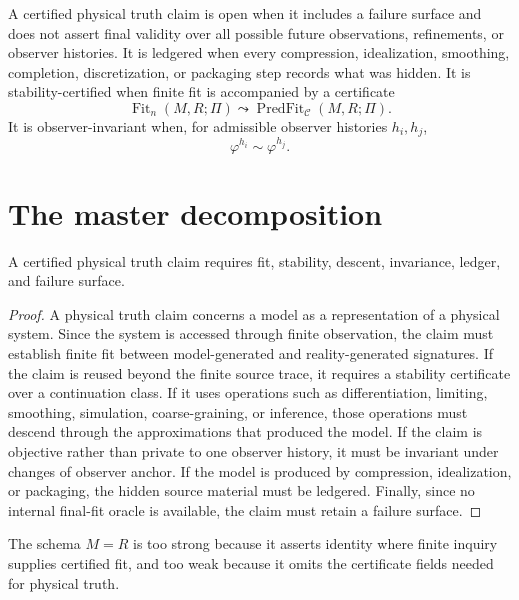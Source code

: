 \begin{definition}
\label{def:open-ledgered-stability-observer-truth}
A certified physical truth claim is open when it includes a failure surface and does not assert final validity over all possible future observations, refinements, or observer histories. It is ledgered when every compression, idealization, smoothing, completion, discretization, or packaging step records what was hidden. It is stability-certified when finite fit is accompanied by a certificate
$$
\operatorname{Fit}_n(M,R;\Pi)
\leadsto
\operatorname{PredFit}_{\mathcal C}(M,R;\Pi).
$$
It is observer-invariant when, for admissible observer histories $h_i,h_j$,
$$
\varphi^{h_i}
\sim
\varphi^{h_j}.
$$
\end{definition}

\section{The master decomposition}
\label{sec:master-decomposition}

\begin{theorem}
\label{thm:physical-truth-decomposes}
A certified physical truth claim requires fit, stability, descent, invariance, ledger, and failure surface.
\end{theorem}

\begin{proof}
A physical truth claim concerns a model as a representation of a physical system. Since the system is accessed through finite observation, the claim must establish finite fit between model-generated and reality-generated signatures. If the claim is reused beyond the finite source trace, it requires a stability certificate over a continuation class. If it uses operations such as differentiation, limiting, smoothing, simulation, coarse-graining, or inference, those operations must descend through the approximations that produced the model. If the claim is objective rather than private to one observer history, it must be invariant under changes of observer anchor. If the model is produced by compression, idealization, or packaging, the hidden source material must be ledgered. Finally, since no internal final-fit oracle is available, the claim must retain a failure surface.
\end{proof}

\begin{corollary}
\label{cor:identity-wrong-truth-schema}
The schema $M=R$ is too strong because it asserts identity where finite inquiry supplies certified fit, and too weak because it omits the certificate fields needed for physical truth.
\end{corollary}

